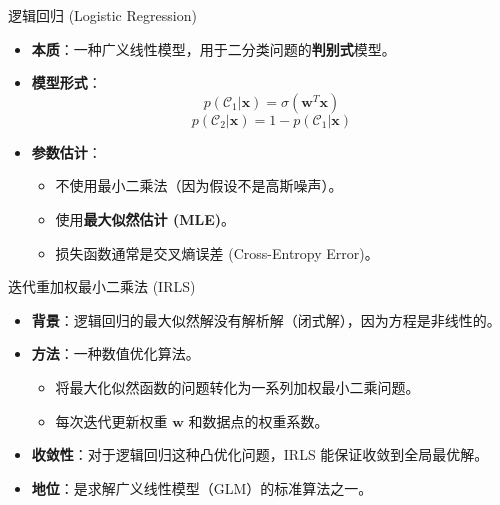 \documentclass[12pt, aspectratio=169]{beamer}
\newcommand{\vect}[1]{\mathbf{#1}}
\begin{document}
\begin{frame}{逻辑回归 (Logistic Regression)}
    \begin{itemize}
        \item \textbf{本质}：一种广义线性模型，用于二分类问题的\textbf{判别式}模型。
        \item \textbf{模型形式}：
        $$ p(\mathcal{C}_1|\vect{x}) = \sigma(\vect{w}^T \vect{x}) $$
        $$ p(\mathcal{C}_2|\vect{x}) = 1 - p(\mathcal{C}_1|\vect{x}) $$
        \item \textbf{参数估计}：
        \begin{itemize}
            \item 不使用最小二乘法（因为假设不是高斯噪声）。
            \item 使用\textbf{最大似然估计 (MLE)}。
            \item 损失函数通常是交叉熵误差 (Cross-Entropy Error)。
        \end{itemize}
    \end{itemize}
\end{frame}

\begin{frame}{迭代重加权最小二乘法 (IRLS)}
    \begin{itemize}
        \item \textbf{背景}：逻辑回归的最大似然解没有解析解（闭式解），因为方程是非线性的。
        \item \textbf{方法}：一种数值优化算法。
        \begin{itemize}
            \item 将最大化似然函数的问题转化为一系列加权最小二乘问题。
            \item 每次迭代更新权重 $\vect{w}$ 和数据点的权重系数。
        \end{itemize}
        \item \textbf{收敛性}：对于逻辑回归这种凸优化问题，IRLS 能保证收敛到全局最优解。
        \item \textbf{地位}：是求解广义线性模型（GLM）的标准算法之一。
    \end{itemize}
\end{frame}
\end{document}
